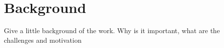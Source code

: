 \section{Background} 
\label{sec:background}
Give a little background of the work. Why is it important, what are the challenges and motivation
